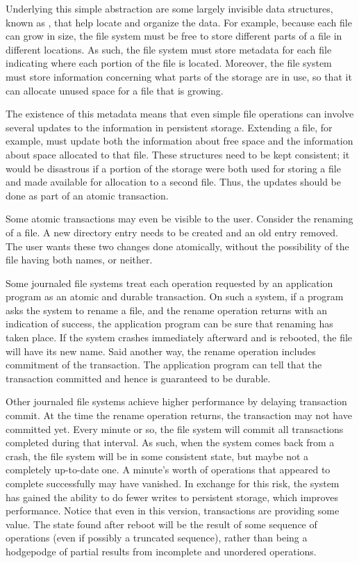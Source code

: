 Underlying this simple abstraction are some largely invisible
data structures, known as , that help locate and
organize the data.  For example, because each file can grow in size,
the file system must be free to store different parts of a file in
different locations.  As such, the file system must store
metadata for each file indicating where each portion of the
file is located.  Moreover, the file system must store information concerning
what parts of the storage are in use, so that it can allocate unused
space for a file that is growing.

The existence of this metadata means that even simple file operations
can involve several updates to the information in persistent storage.
Extending a file, for example, must update both the information about
free space and the information about space allocated to that file.
These structures need to be kept consistent; it would be
disastrous if a portion of the storage were both used for storing a file
and made available for allocation to a second file.  Thus, the updates
should be done as part of an atomic transaction.

Some atomic transactions may even be visible to the user.  Consider
the renaming of a file.  A new directory entry needs to be created and an old
entry removed.  The user wants these two changes done atomically,
without the possibility of the file having both names, or neither.

Some journaled file systems treat each operation requested by an
application program as an atomic and durable transaction.  On such a system, if a
program asks the system to rename a file, and the rename operation
returns with an indication of success, the application program can be
sure that renaming has taken place.  If the system crashes immediately
afterward and is rebooted, the file will have its new name.  Said
another way, the rename operation includes commitment of the
transaction.  The application program can tell that the transaction
committed and hence is guaranteed to be durable.

Other journaled file systems achieve higher performance by delaying
transaction commit.  At the time the rename operation returns, the
transaction may not have committed yet.  Every minute or so, the file
system will commit all transactions completed during that interval.
As such, when the system comes back from a crash, the file system will
be in some consistent state, but maybe not a completely up-to-date one.
A minute's worth of operations that appeared to complete
successfully may have vanished.  In exchange for this risk, the system
has gained the ability to do fewer writes to persistent storage, which improves
performance.  Notice that even in this version, transactions are
providing some value.  The state found after reboot will be the result
of some sequence of operations (even if possibly a truncated
sequence), rather than being a hodgepodge of partial results from
incomplete and unordered operations.

